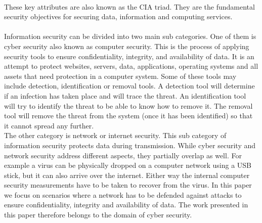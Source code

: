  ~~\\
 These key attributes are also known as the CIA triad. They are the fundamental security objectives for securing data, information and computing services. \\
 \\
Information security can be divided into two main sub categories. One of them is cyber security also known as computer security. This is the process of applying security tools to ensure confidentiality, integrity, and availability of data. It is an attempt to protect websites, servers, data, applications, operating systems and all assets that need protection in a computer system.  Some of these tools may include detection, identification or removal tools. A detection tool will determine if an infection has taken place and will trace the threat. An identification tool will try to identify the threat to be able to know how to remove it. The removal tool will remove the threat from the system (once it has been identified) so that it cannot spread any further. \\
The other category is network or internet security. This sub category of information security protects data during transmission. While cyber security and network security address different aspects, they partially overlap as well. For example a virus can be physically dropped on a computer network using a USB stick, but it can also arrive over the internet. Either way the internal computer security measurements have to be taken to recover from the virus. In this paper we focus on scenarios where a network has to be defended against attacks to ensure confidentiality, integrity and availability of data. The work presented in this paper therefore belongs to the domain of cyber security.




